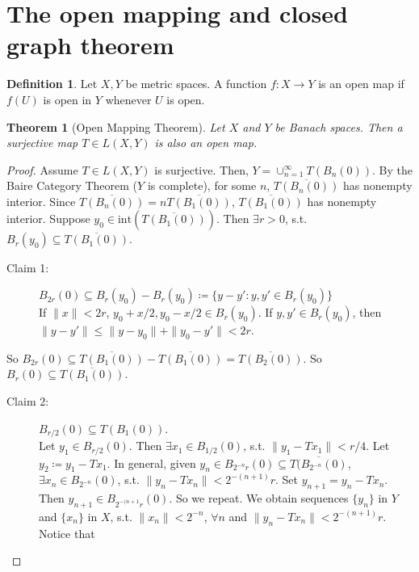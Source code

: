 \documentclass[12pt]{article}
\theoremstyle{plain}
\newtheorem{thm}{Theorem}
\theoremstyle{definition}
\newtheorem*{defn}{Definition}
\begin{document}
\section*{The open mapping and closed graph theorem}
\begin{defn}
    Let $X, Y$ be metric spaces.
    A function $f: X\rightarrow Y$ is an open map if $f(U)$ is open in $Y$ whenever $U$ is open.
\end{defn}

\begin{thm}[Open Mapping Theorem]
    Let $X$ and $Y$ be Banach spaces.
    Then a surjective map $T\in L(X,Y)$ is also an open map.
\end{thm}
\begin{proof}
    Assume $T\in L(X,Y)$ is surjective.
    Then, $Y=\cup_{n=1}^\infty T(B_n(0))$.
    By the Baire Category Theorem ($Y$ is complete), for some $n$, $\overline{T(B_n(0))}$ has nonempty interior.
    Since $\overline{T(B_n(0))} = n\overline{T(B_1(0))}$, $\overline{T(B_1(0))}$ has nonempty interior.
    Suppose $y_0 \in \text{int}(\overline{T(B_1(0))})$.
    Then $\exists r>0$, s.t.\ $B_r(y_0) \subseteq \overline{T(B_1(0))}$.
    \begin{description}
        \item[Claim 1: ]$B_{2r}(0)\subseteq B_r(y_0) - B_r(y_0)\coloneqq \{y-y':y, y'\in B_r(y_0)\}$\\
            If $\|x\| < 2r$, $y_0+x/2, y_0-x/2\in B_r(y_0)$.
            If $y, y'\in B_r(y_0)$, then $\|y-y'\| \leq \|y-y_0\| + \|y_0-y'\| < 2r$.
    \end{description}
    So $B_{2r}(0)\subseteq \overline{T(B_1(0))} - \overline{T(B_1(0))} = \overline{T(B_2(0))}$.
    So $B_r(0)\subseteq \overline{T(B_1(0))}$.
    \begin{description}
        \item[Claim 2: ]$B_{r/2}(0) \subseteq T(B_1(0))$.\\
            Let $y_1\in B_{r/2}(0)$.
            Then $\exists x_1\in B_{1/2}(0)$, s.t. $\|y_1 - Tx_1\|<r/4$.
            Let $y_2\coloneqq y_1-Tx_1$.
            In general, given $y_n \in B_{2^{-n}r}(0) \subseteq \overline{T(B_{2^{-n}}(0)}$,
            $\exists x_n\in B_{2^{-n}}(0)$, s.t. $\|y_n - Tx_n\| < 2^{-(n+1)}r$.
            Set $y_{n+1} = y_n - Tx_n$.
            Then $y_{n+1}\in B_{2^{-(n+1}r}(0)$.
            So we repeat.
            We obtain sequences $\{y_n\}$ in $Y$ and $\{x_n\}$ in $X$, s.t. $\|x_n\| < 2^{-n}$, $\forall n$ and $\|y_n -
            Tx_n\|<2^{-(n+1)}r$.
            Notice that 

\end{description}
\end{proof}
\end{document}
